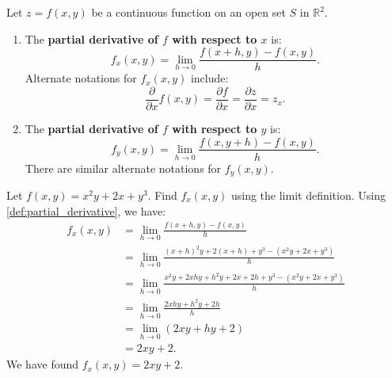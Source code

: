 \begin{definition}\label{def:partial_derivative}
Let $z=f(x,y)$ be a continuous function on an open set $S$ in $\mathbb{R}^2$.
\begin{enumerate}
	\item The \textbf{partial derivative of $f$ with respect to $x$} is:
	\[f_x(x,y) = \lim_{h\to 0} \frac{f(x+h,y) - f(x,y)}h.\]
	Alternate notations for $f_x(x,y)$ include:
	\[\frac{\partial}{\partial x}f(x,y)=\frac{\partial f}{\partial x}=\frac{\partial z}{\partial x}=z_x.\]
	\item The \textbf{partial derivative of $f$ with respect to $y$} is:
	\[f_y(x,y) = \lim_{h\to 0} \frac{f(x,y+h) - f(x,y)}h.\]
	There are similar alternate notations for $f_y(x,y)$.
	
	\end{enumerate}
\end{definition}



\begin{example}\label{ex_partial1}
Let $f(x,y) = x^2y + 2x+y^3$. Find $f_x(x,y)$ using the limit definition.
\solution
Using \autoref{def:partial_derivative}, we have:
\begin{align*}
f_x(x,y) &= \lim_{h\to 0} \frac{f(x+h,y) - f(x,y)}{h} \\
				&= \lim_{h\to 0} \frac{(x+h)^2y+2(x+h)+y^3 - (x^2y+2x+y^3)}{h}\\
				&= \lim_{h\to 0} \frac{x^2y+2xhy+h^2y+2x+2h+y^3-(x^2y+2x+y^3)}{h}\\
				&= \lim_{h\to 0} \frac{2xhy+h^2y+2h}{h}\\
				&=\lim_{h\to 0}(2xy+hy+2)\\
				&= 2xy+2.
\end{align*}
We have found $f_x(x,y) = 2xy+2$.
\end{example}

